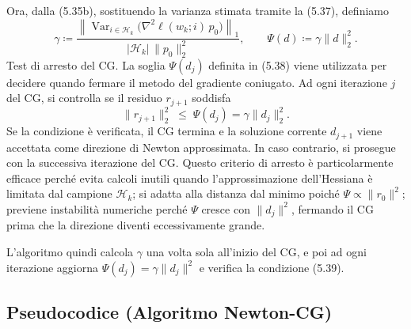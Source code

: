 \documentclass[italian, a4paper, twoside, binding=6mm]{sapthesis}
\begin{document}
Ora, dalla (5.35b), sostituendo la varianza stimata tramite la (5.37), definiamo
\[
\gamma \coloneqq
\frac{\left\| \operatorname{Var}_{i\in\mathcal{H}_k}\bigl(\nabla^2\ell(w_k;i)\,p_0\bigr) \right\|_1}{|\mathcal{H}_k| \, \|p_0\|_2^2},
\qquad
\Psi(d) \coloneqq \gamma \|d\|_2^2.
\tag{5.38}
\]
\medskip
\noindent
Test di arresto del CG.
La soglia $\Psi(d_j)$ definita in (5.38) viene utilizzata per decidere quando fermare il metodo del gradiente coniugato. Ad ogni iterazione $j$ del CG, si controlla se il residuo $r_{j+1}$ soddisfa
\[
\| r_{j+1} \|_2^2 \;\le\; \Psi(d_j) = \gamma \|d_j\|_2^2.
\tag{5.39}
\]
Se la condizione è verificata, il CG termina e la soluzione corrente $d_{j+1}$ viene accettata come direzione di Newton approssimata. In caso contrario, si prosegue con la successiva iterazione del CG.
Questo criterio di arresto è particolarmente efficace perché evita calcoli inutili quando l'approssimazione dell'Hessiana è limitata dal campione $\mathcal{H}_k$; si adatta alla distanza dal minimo poiché $\Psi \propto \|r_0\|^2$; previene instabilità numeriche perché $\Psi$ cresce con $\|d_j\|^2$, fermando il CG prima che la direzione diventi eccessivamente grande.

L'algoritmo quindi calcola $\gamma$ una volta sola all'inizio del CG, e poi ad ogni iterazione aggiorna $\Psi(d_j) = \gamma \|d_j\|^2$ e verifica la condizione (5.39).
\medskip
\noindent
\subsection{Pseudocodice (Algoritmo Newton-CG)}
\end{document}
